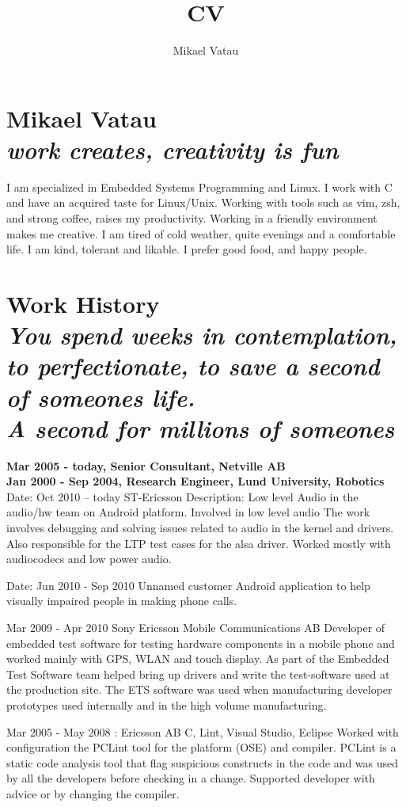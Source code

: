 \documentclass[a4paper]{article}
\author{Mikael Vatau}
\title{CV}
\begin{document}
\section{Mikael Vatau \emph{\\work creates, creativity is fun}}
I am specialized in Embedded Systems Programming and Linux. I work with C and 
have an acquired taste for Linux/Unix. Working with tools such as vim, zsh, 
and strong coffee, raises my productivity. Working in a friendly environment
makes me creative. I am tired of cold weather, quite 
evenings and a comfortable life. I am kind, tolerant and likable. I 
prefer good food, and happy people. 

\section{Work History \\ \emph { {\small You spend weeks in contemplation, \\to perfectionate, to save a second of someones life.\\A second for millions of someones}}}
\textbf{Mar 2005 - today, Senior Consultant, Netville AB}\\
\textbf{Jan 2000 - Sep 2004, Research Engineer, Lund University, Robotics}\\




Date: 	Oct 2010 – today
ST-Ericsson
Description: 	Low level Audio in the audio/hw team on Android platform. Involved in low level audio  The work involves debugging and solving issues related to audio in the kernel and drivers. Also responsible for the LTP test cases for the alsa driver. Worked mostly with audiocodecs and low power audio.

Date: 	Jun 2010 - Sep 2010
Unnamed customer
Android application to help visually impaired people in making phone calls. 

 
Mar 2009 - Apr 2010
Sony Ericsson Mobile Communications AB		
Developer of embedded test software for testing hardware components in a mobile phone and worked mainly with GPS, WLAN and touch display. As part of the Embedded Test Software team helped bring up drivers and write the test-software used at the production site. The ETS software was used  when manufacturing developer prototypes used internally and in the high volume manufacturing.
 
Mar 2005 - May 2008	: 
Ericsson AB	
C, Lint, Visual Studio, Eclipse
Worked with configuration the PCLint tool for the platform (OSE) and compiler. PCLint is a static code analysis tool that flag suspicious constructs in the code and was used by all the developers before checking in a change. Supported developer with advice or by changing the compiler.
\end{document}

